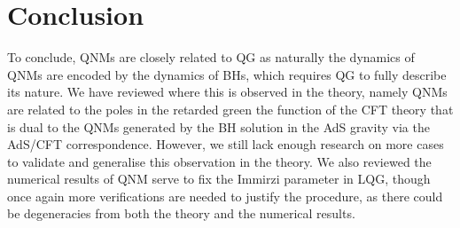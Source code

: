 \documentclass[a4paper, 12pt]{article}
\begin{document}
   \section{Conclusion}%
    \label{sec:Conclusion}
    To conclude, QNMs are closely related to QG as naturally the dynamics
    of QNMs are encoded by the dynamics of BHs, which requires QG to fully
    describe its nature. We have reviewed where this is observed in the
    theory, namely QNMs are related to the poles in the retarded green
    the function of the CFT theory that is dual to the QNMs generated
    by the BH solution in the AdS gravity via the
    AdS/CFT correspondence. However, we still lack enough research
    on more cases to validate and generalise this observation in the
    theory. We also reviewed the numerical results of QNM serve to fix
    the Immirzi parameter in LQG, though once again more
    verifications are needed to justify the procedure, as there could be
    degeneracies from both the theory and the numerical results. 


  





\newpage


        
\end{document}
